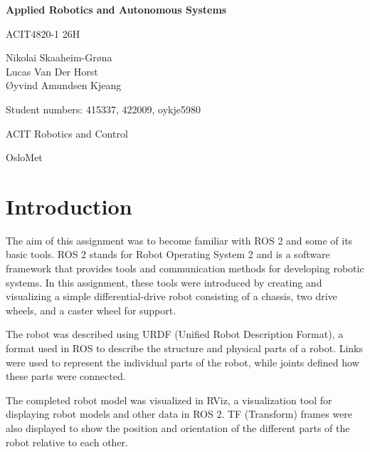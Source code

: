 \documentclass[10pt,a4paper]{article}
\begin{document}
\begin{center}
    {\Large \textbf{Applied Robotics and Autonomous Systems}}

    \vspace{0.3cm}

    ACIT4820-1 26H

    \vspace{0.3cm}

    Nikolai Skaaheim-Grøna \\
    Lucas Van Der Horst \\
    Øyvind Amundsen Kjeang

    \vspace{0.3cm}

    Student numbers: 415337, 422009, oykje5980

    \vspace{0.2cm}

    ACIT Robotics and Control

    \vspace{0.1cm}

    OsloMet
\end{center}

\vspace{0.4cm}

\tableofcontents

\vspace{0.5cm}

\section{Introduction}

The aim of this assignment was to become familiar with ROS 2 and some of its basic tools. ROS 2 stands for Robot Operating System 2 and is a software framework that provides tools and communication methods for developing robotic systems. In this assignment, these tools were introduced by creating and visualizing a simple differential-drive robot consisting of a chassis, two drive wheels, and a caster wheel for support.

The robot was described using URDF (Unified Robot Description Format), a format used in ROS to describe the structure and physical parts of a robot. Links were used to represent the individual parts of the robot, while joints defined how these parts were connected.

The completed robot model was visualized in RViz, a visualization tool for displaying robot models and other data in ROS 2. TF (Transform) frames were also displayed to show the position and orientation of the different parts of the robot relative to each other.
\end{document}
